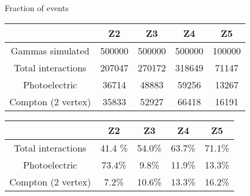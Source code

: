 \documentclass{beamer}
\begin{document}
%

\begin{frame}{Fraction of events}
\begin{center}
 \begin{tabular}{c|cccc|}
  \toprule
    & \textbf{Z2} & \textbf{Z3} & \textbf{Z4} & \textbf{Z5} \\
   \hline
  Gammas simulated & 500000 & 500000 & 500000  & 100000\\
  Total interactions & 207047 & 270172 & 318649  & 71147\\
  Photoelectric & 36714 & 48883 & 59256 & 13267\\
  Compton (2 vertex) & 35833 & 52927 & 66418 & 16191 \\ 
  \toprule
 \end{tabular}
  \begin{tabular}{c|cccc|}
   \toprule
     & \textbf{Z2} & \textbf{Z3} & \textbf{Z4} & \textbf{Z5} \\
    \hline
   Total interactions & 41.4 \% & 54.0\% & 63.7\%  & 71.1\%\\
   Photoelectric & 73.4\% & 9.8\% & 11.9\% & 13.3\%\\
   Compton (2 vertex) & 7.2\% & 10.6\% & 13.3\% & 16.2\% \\ 
   \toprule
  \end{tabular}
\end{center}
\end{frame}
\end{document}
